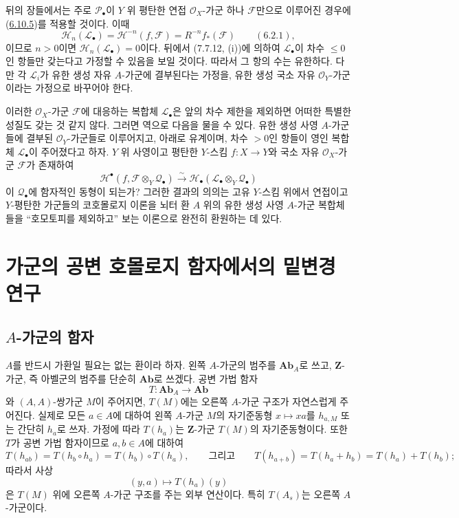 \begin{remark}[6.10.6]
뒤의 장들에서는 주로 $\mathscr P_\bullet$이 $Y$ 위 평탄한 연접
$\mathscr O_X$-가군 하나 $\mathscr F$만으로 이루어진 경우에
(\hyperref[III.6.10.5-fr]{6.10.5})를 적용할 것이다. 이때
\[
  \mathscr H_n(\mathscr L_\bullet)
  =
  \mathscr H^{-n}(f,\mathscr F)
  =
  R^{-n}f_*(\mathscr F)
  \qquad(6.2.1),
\]
이므로 $n>0$이면 $\mathscr H_n(\mathscr L_\bullet)=0$이다. 뒤에서
(7.7.12, (i))에 의하여 $\mathscr L_\bullet$이 차수
$\leqslant0$인 항들만 갖는다고 가정할 수 있음을 보일 것이다.
따라서 그 항의 수는 유한하다. 다만 각 $\mathscr L_i$가 유한 생성
자유 $A$-가군에 결부된다는 가정을, 유한 생성 국소 자유
$\mathscr O_Y$-가군이라는 가정으로 바꾸어야 한다.

이러한 $\mathscr O_X$-가군 $\mathscr F$에 대응하는 복합체
$\mathscr L_\bullet$은
앞의 차수 제한을 제외하면 어떠한 특별한 성질도 갖는 것 같지 않다.
그러면 역으로 다음을 물을 수 있다. 유한 생성 사영 $A$-가군들에
결부된 $\mathscr O_Y$-가군들로 이루어지고, 아래로 유계이며, 차수
$>0$인 항들이 영인 복합체 $\mathscr L_\bullet$이 주어졌다고 하자.
$Y$ 위 사영이고 평탄한 $Y$-스킴 $f:X\to Y$와 국소 자유
$\mathscr O_X$-가군 $\mathscr F$가 존재하여
\[
  \mathscr H^\bullet
  (f,\mathscr F\otimes_Y\mathscr Q_\bullet)
  \xrightarrow{\sim}
  \mathscr H_\bullet
  (\mathscr L_\bullet\otimes_Y\mathscr Q_\bullet)
\]
이 $\mathscr Q_\bullet$에 함자적인 동형이 되는가? 그러한 결과의
의의는 고유 $Y$-스킴 위에서 연접이고 $Y$-평탄한 가군들의
코호몰로지 이론을 뇌터 환 $A$ 위의 유한 생성 사영 $A$-가군
복합체들을 ``호모토피를 제외하고'' 보는 이론으로 완전히 환원하는
데 있다.
\end{remark}

\section{가군의 공변 호몰로지 함자에서의 밑변경 연구}
\label{section:III.7.fr}

\subsection{$A$-가군의 함자}
\label{subsection:III.7.1.fr}

\begin{env}[7.1.1]
\label{III.7.1.1-fr}
$A$를 반드시 가환일 필요는 없는 환이라 하자. 왼쪽 $A$-가군의
범주를 $\mathbf{Ab}_A$로 쓰고, $\mathbf Z$-가군, 즉 아벨군의
범주를 단순히 $\mathbf{Ab}$로 쓰겠다. 공변 가법 함자
\[
  T:\mathbf{Ab}_A\longrightarrow\mathbf{Ab}
\]
와 $(A,A)$-쌍가군 $M$이 주어지면, $T(M)$에는 오른쪽 $A$-가군
구조가 자연스럽게 주어진다. 실제로 모든 $a\in A$에 대하여 왼쪽
$A$-가군 $M$의 자기준동형 $x\mapsto xa$를 $h_{a,M}$ 또는 간단히
$h_a$로 쓰자. 가정에 따라 $T(h_a)$는 $\mathbf Z$-가군 $T(M)$의
자기준동형이다. 또한 $T$가 공변 가법 함자이므로 $a,b\in A$에 대하여
\[
  T(h_{ab})
  =
  T(h_b\circ h_a)
  =
  T(h_b)\circ T(h_a),
  \qquad\text{그리고}\qquad
  T(h_{a+b})
  =
  T(h_a+h_b)
  =
  T(h_a)+T(h_b);
\]
따라서 사상
\[
  (y,a)\longmapsto T(h_a)(y)
\]
은 $T(M)$ 위에 오른쪽 $A$-가군 구조를 주는 외부 연산이다. 특히
$T(A_s)$는 오른쪽 $A$-가군이다.
\end{env}

